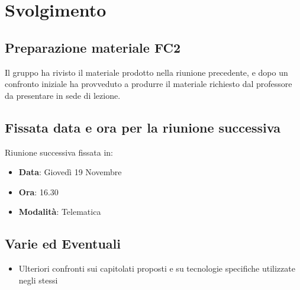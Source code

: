 \documentclass[]{article}
\begin{document}
	\section{Svolgimento}
	\subsection{Preparazione materiale FC2}
	Il gruppo ha rivisto il materiale prodotto nella riunione precedente, e dopo un confronto iniziale ha provveduto a produrre il materiale richiesto dal professore da presentare in sede di lezione. 
	\subsection{Fissata data e ora per la riunione successiva}
	Riunione successiva fissata in:
	\begin{itemize}
		\item \textbf{Data}: Giovedì 19 Novembre
		\item \textbf{Ora}: 16.30
		\item \textbf{Modalità}: Telematica
	\end{itemize}
	
	\subsection{Varie ed Eventuali}
	\begin{itemize}
		\item Ulteriori confronti sui capitolati proposti e su tecnologie specifiche utilizzate negli stessi
	\end{itemize}
  
\end{document}
